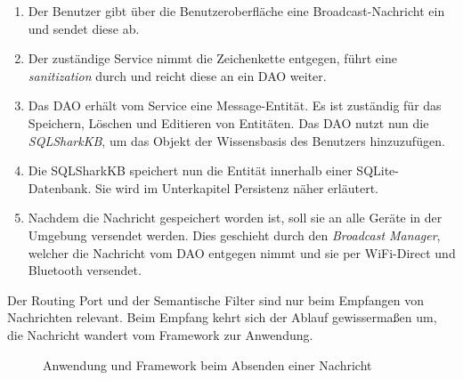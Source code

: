\begin{enumerate}
	\item Der Benutzer gibt über die Benutzeroberfläche eine Broadcast-Nachricht ein und sendet diese ab. 
	\item Der zuständige Service nimmt die Zeichenkette entgegen, führt eine \textit{sanitization} durch und reicht diese an ein DAO weiter.
	\item Das DAO erhält vom Service eine Message-Entität. Es ist zuständig für das Speichern, Löschen und Editieren von Entitäten. Das DAO nutzt nun die \textit{SQLSharkKB}, um das Objekt der Wissensbasis des Benutzers hinzuzufügen. 
	\item Die SQLSharkKB speichert nun die Entität innerhalb einer SQLite-Datenbank. Sie wird im Unterkapitel Persistenz näher erläutert.
	\item Nachdem die Nachricht gespeichert worden ist, soll sie an alle Geräte in der Umgebung versendet werden. Dies geschieht durch den \textit{Broadcast Manager}, welcher die Nachricht vom DAO entgegen nimmt und sie per WiFi-Direct und Bluetooth versendet.
\end{enumerate}\newpage
Der Routing Port und der Semantische Filter sind nur beim Empfangen von Nachrichten relevant. Beim Empfang kehrt sich der Ablauf gewissermaßen um, die Nachricht wandert vom Framework zur Anwendung. 
\begin{figure}[H]
	\centering
	\caption{Anwendung und Framework beim Absenden einer Nachricht}
	\label{fig:empfangenNachrichtStruktur}
\end{figure}
